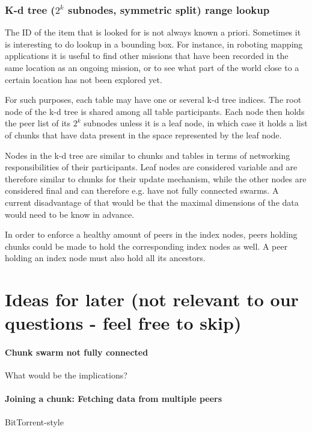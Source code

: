 \documentclass[a4paper, 10pt, conference]{ieeeconf}
\begin{document}
\subsubsection{K-d tree ($2^k$ subnodes, symmetric split) range lookup}

The ID of the item that is looked for is not always known a priori. Sometimes
it is interesting to do lookup in a bounding box. For instance, in roboting
mapping applications it is useful to find other missions that have been recorded
in the same location as an ongoing mission, or to see what part of the
world close to a certain location has not been explored yet.

For such purposes, each table may have one or several k-d tree indices.
The root node of the k-d tree is shared among all table participants. Each
node then holds the peer list of its $2^k$ subnodes unless it is a leaf node,
in which case it holds a list of chunks that have data present in the space
represented by the leaf node.

Nodes in the k-d tree are similar to chunks and tables in terms of networking
responsibilities of their participants. Leaf nodes are considered variable and
are therefore similar to chunks for their update mechanism, while the other
nodes are considered final and can therefore e.g. have not fully connected
swarms. A current disadvantage of that would be that the maximal dimensions of
the data would need to be know in advance.

In order to enforce a healthy amount of peers in the index nodes, peers holding
chunks could be made to hold the corresponding index nodes as well. A peer
holding an index node must also hold all its ancestors.

\section{Ideas for later (not relevant to our questions - feel free to skip)}

\paragraph{Chunk swarm not fully connected}
What would be the implications?

\paragraph{Joining a chunk: Fetching data from multiple peers} 
BitTorrent-style
\end{document}
